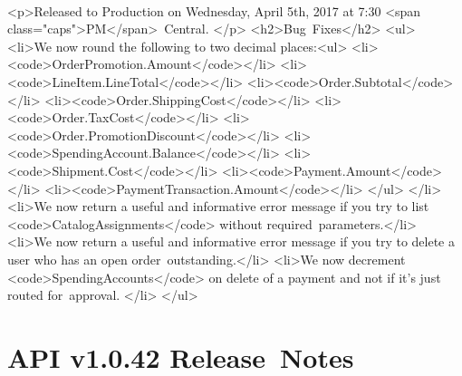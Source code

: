 \documentclass{memoir}%
\begin{document}
\paragraph*{}%

%
\paragraph*{}%
<p>Released to Production on Wednesday, April 5th, 2017 at 7:30 <span class="caps">PM</span>~Central. </p>\newline%
<h2>Bug~Fixes</h2>\newline%
<ul>\newline%
<li>We now round the following to two decimal places:<ul>\newline%
<li><code>OrderPromotion.Amount</code></li>\newline%
<li><code>LineItem.LineTotal</code></li>\newline%
<li><code>Order.Subtotal</code></li>\newline%
<li><code>Order.ShippingCost</code></li>\newline%
<li><code>Order.TaxCost</code></li>\newline%
<li><code>Order.PromotionDiscount</code></li>\newline%
<li><code>SpendingAccount.Balance</code></li>\newline%
<li><code>Shipment.Cost</code></li>\newline%
<li><code>Payment.Amount</code></li>\newline%
<li><code>PaymentTransaction.Amount</code></li>\newline%
</ul>\newline%
</li>\newline%
<li>We now return a useful and informative error message if you try to list <code>CatalogAssignments</code> without required~parameters.</li>\newline%
<li>We now return a useful and informative error message if you try to delete a user who has an open order~outstanding.</li>\newline%
<li>We now decrement <code>SpendingAccounts</code> on delete of a payment and not if it’s just routed for~approval. </li>\newline%
</ul>

%
\section*{API v1.0.42 Release~Notes}%
\paragraph*{}%
\end{document}
